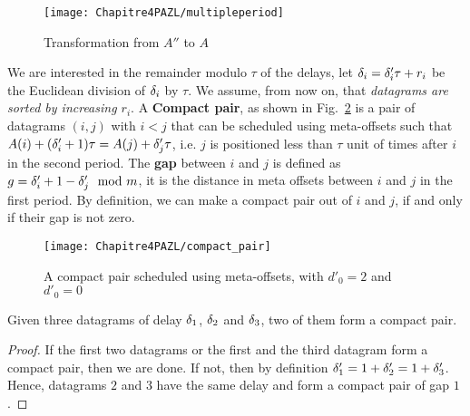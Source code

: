 \begin{figure}
 \begin{center}
\texttt{[image: Chapitre4PAZL/multipleperiod]}
\end{center}
\caption{Transformation from $A''$ to $A$}
\label{fig:multipleperiod}
\end{figure}


We are interested in the remainder modulo $\tau$ of the delays, let $\delta_i = \delta_{i}'\tau + r_i$ be the Euclidean division of $\delta_i$ by $\tau$. We assume, from now on, that \emph{datagrams are sorted by increasing $r_i$}.
A \textbf{Compact pair}, as shown in Fig.~\ref{fig:compactpair} is a pair of datagrams $(i,j)$ with $i < j$ that can be scheduled using meta-offsets such that $A(i) + (\delta'_i+1)\tau = A(j) + \delta'_j\tau$, i.e. $j$ is positioned less than $\tau$ unit of times after $i$ in the second period.
The \textbf{gap} between $i$ and $j$ is defined as  $g = \delta_{i}' + 1 - \delta_{j}' \mod m$, it is the distance in meta offsets between $i$ and $j$ in the first period. By definition, we can make a compact pair out of $i$ and $j$, if and only if their gap is not zero.

\begin{figure}[h]
\begin{center}



\texttt{[image: Chapitre4PAZL/compact\_pair]}
\end{center}
\caption{A compact pair scheduled using meta-offsets, with $d'_0 = 2$ and $d'_0 = 0$}
\label{fig:compactpair}
\end{figure}

\begin{lemma}\label{lemma:pair_find}
Given three datagrams of delay $\delta_{1}$, $\delta_{2}$ and $\delta_{3}$, two of them form a compact pair. 
\end{lemma}
\begin{proof}
If the first two datagrams or the first and the third datagram form a compact pair,
then we are done. If not, then by definition $\delta_{1}' = 1 + \delta_{2}' = 1 + \delta_{3}'$. Hence, datagrams $2$ and $3$ have the same delay and form a compact pair of gap $1$.
\end{proof}

